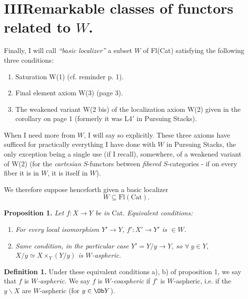 
\section*{III\quad Remarkable classes of functors related to $W$.}

Finally, I will call \textit{``basic localizer''} a subset $W$ of Fl(Cat) satisfying the following three conditions: %

\begin{enumerate}
\item[(i)] Saturation W(1) (cf. reminder p. 1).
\item[(ii)] Final element axiom W(3) (page 3).
\item[(iii)] The weakened variant W(2 bis) of the localization axiom W(2) given in the corollary on page 1 (formerly it was L4$'$ in Pursuing Stacks).
\end{enumerate}

When I need more from $W$, I will say so explicitly. These three axioms have sufficed for practically everything I have done with $W$ in Pursuing Stacks, the only exception being a single use (if I recall), somewhere, of a weakened variant of W(2) (for the \textit{cartesian} $S$-functors between \textit{fibered} $S$-categories - if on every fiber it is in $W$, it is itself in $W$).

We therefore suppose henceforth given a basic localizer
\[
W \subseteq \mathrm{Fl}(\mathrm{Cat}).
\]

\textbf{Proposition 1.} \textit{Let $f : X \longrightarrow Y$ be in} \textup{Cat}. \textit{Equivalent conditions:}

\begin{enumerate}
\item[\textit{a)}] \textit{For every local isomorphism $Y' \longrightarrow Y$, $f' : X' \longrightarrow Y'$ is $\in W$.}
\item[\textit{b)}] \textit{Same condition, in the particular case $Y' = Y/y \longrightarrow Y$, so $\forall\ y \in Y$, $X/y \simeq X \times_Y (Y/y)$ is $W$-aspheric.}
\end{enumerate}

\textbf{Definition 1.} Under these equivalent conditions a), b) of proposition 1, we say that $f$ is \textit{$W$-aspheric.} We say $f$ is \textit{$W$-coaspheric} if $f^{\circ}$ is $W$-aspheric, i.e. if the $y\backslash X$ are $W$-aspheric (for $y \in \Ob Y$).

